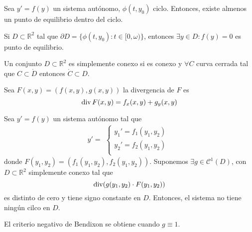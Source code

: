 \begin{prop}
  Sea $y' = f(y)$ un sistema autónomo, $\phi(t, y_{0})$ ciclo. Entonces, existe almenos un punto de equilibrio dentro del ciclo.
\end{prop}

\begin{obs}
  Si $D \subset \mathbb{R}^{2}$ tal que $\partial{D} = \{ \phi(t,y_{0}) : t \in [0, \omega) \}$, entonces $\exists y \in D : f(y) = 0$ es punto de equilibrio.
\end{obs}

\begin{defn}
  Un conjunto $D \subset \mathbb{R}^{2}$ es simplemente conexo si es conexo y $\forall C$ curva cerrada tal que $C \subset \mathring{D}$ entonces $\mathring{C} \subset D$.
\end{defn}

\begin{defn}[Divergencia]
  Sea $F(x,y) = (f(x,y), g(x,y))$ la divergencia de $F$ es 
  \[ 
    \operatorname{div} F(x,y) = f_{x}(x, y) + g_{y}(x,y)
  \] 
\end{defn}

\begin{theo}
  Sea $y' = f(y)$ un sistema autónomo tal que
  \[ 
    y' =
    \begin{aligned}
      \begin{cases}
        y_{1}' = f_{1}(y_{1}, y_{2}) \\
        y_{2}' = f_{2}(y_{1}, y_{2}) \\
      \end{cases}
    \end{aligned} 
  \] 
  donde $F(y_{1}, y_{2}) = (f_{1}(y_{1}, y_{2}), f_{2}(y_{1}, y_{2}))$. Suponemos $\exists g \in \mathcal{C}^{1}(D)$, con $D \subset \mathbb{R}^{2}$ simplemente conexo tal que
  \[ 
    \operatorname{div} (g(y_{1},y_{2}) \cdot F(y_{1}, y_{2}))
  \] 
  es distinto de cero y tiene signo constante en $D$. Entonces, el sistema no tiene ningún cilco en $D$.
\end{theo}

\begin{obs}
  El criterio negativo de Bendixon se obtiene cuando $g \equiv 1$.
\end{obs}
